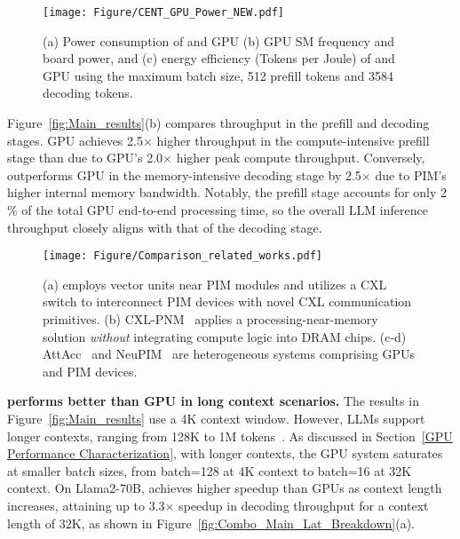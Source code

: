 \begin{figure*}[t]
    \centering
    \texttt{[image: Figure/CENT\_GPU\_Power\_NEW.pdf]}
    \caption{(a) Power consumption of \att{} and GPU (b) GPU SM frequency and board power, and (c) energy efficiency (Tokens per Joule) of \att{} and GPU
    using the maximum batch size, 512 prefill tokens and 3584 decoding tokens.}
	\label{fig:Energy_Power}
\end{figure*}

Figure~\ref{fig:Main_results}(b) compares throughput in the prefill and decoding stages.
GPU achieves 2.5$\times$ higher throughput in the compute-intensive prefill stage than \att{} due to GPU's 2.0$\times$ higher peak compute throughput.
Conversely, \att{} outperforms GPU in the memory-intensive decoding stage by 2.5$\times$ due to PIM's higher internal memory bandwidth.
Notably, the prefill stage accounts for only 2$\%$ of the total GPU end-to-end processing time, so the overall LLM inference throughput closely aligns with that of the decoding stage.




\begin{figure*}[t]
	\centering
  	\texttt{[image: Figure/Comparison\_related\_works.pdf]}
	\caption{(a) \att{} employs vector units near PIM modules and utilizes a CXL switch to interconnect PIM devices with novel CXL communication primitives. (b) CXL-PNM~\cite{cxl-pnm} applies a processing-near-memory solution \emph{without} integrating compute logic into DRAM chips. (c-d) AttAcc~\cite{AttAcc} and NeuPIM~\cite{NeuPIM} are heterogeneous systems comprising GPUs and PIM devices.
    }
\label{fig:Comparison_related_works}
\end{figure*}

\textbf{\att{} performs better than GPU in long context scenarios.}
The results in Figure~\ref{fig:Main_results} use a 4K context window.
However, \sota{} LLMs support longer contexts, ranging from 128K to 1M tokens~\cite{gpt4-turbo, gemini-pro}.
As discussed in Section~\ref{GPU Performance Characterization}, with longer contexts, the GPU system saturates at smaller batch sizes, from batch=128 at 4K context to batch=16 at 32K context.
On Llama2-70B, \att{} achieves higher speedup than GPUs as context length increases, attaining up to 3.3$\times$ speedup in decoding throughput for a context length of 32K, as shown in Figure~\ref{fig:Combo_Main_Lat_Breakdown}(a). 


